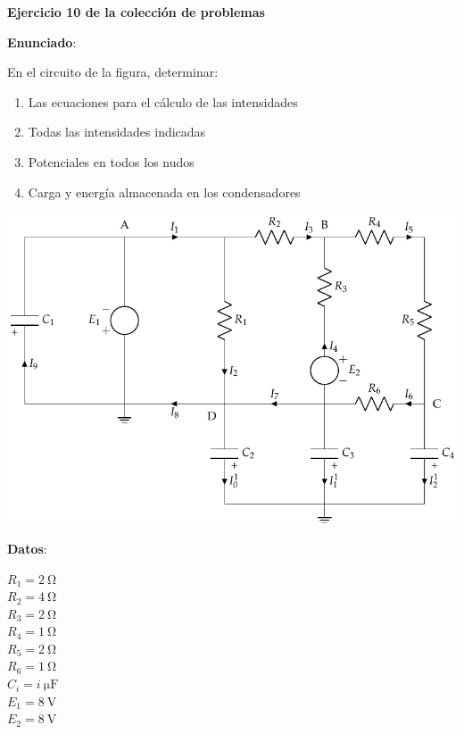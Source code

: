 \documentclass[10pt]{article}
\begin{document}
\large{\textbf{Ejercicio 10 de la colección de problemas}}

\vspace{3mm}
\large{\textbf{Enunciado}}:

\vspace{5mm}

En el circuito de la figura, determinar:
\begin{enumerate}
    \item Las ecuaciones para el cálculo de las intensidades
    \item Todas las intensidades indicadas
    \item Potenciales en todos los nudos
    \item Carga y energía almacenada en los condensadores
\end{enumerate}

\begin{minipage}{0.85\linewidth}
  \includegraphics[scale=1.1]{figs/BT1_11.pdf}
\end{minipage}
\hfill
\begin{minipage}{0.11\linewidth}
    \vspace{-40mm}
    
    \textbf{Datos}:
    \vspace{2mm}
    
    $R_1 = \qty{2}{\ohm}$\\
    $R_2 = \qty{4}{\ohm}$\\
    $R_3 = \qty{2}{\ohm}$\\
    $R_4 = \qty{1}{\ohm}$\\
    $R_5 = \qty{2}{\ohm}$\\
    $R_6 = \qty{1}{\ohm}$\\
    $C_i = \qty[parse-numbers=false]{i}{\micro\farad}$\\
    $E_1=\qty{8}{\volt}$\\
    $E_2 = \qty{8}{\volt}$   
\end{minipage}
\end{document}
